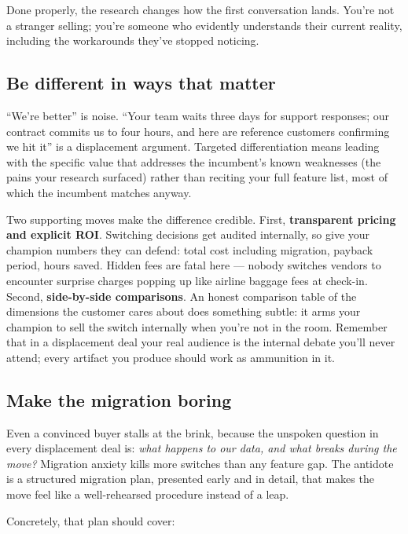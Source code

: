 Done properly, the research changes how the first conversation lands. You're not a stranger selling; you're someone who evidently understands their current reality, including the workarounds they've stopped noticing.



\subsection{Be different in ways that matter}


``We're better'' is noise. ``Your team waits three days for support responses; our contract commits us to four hours, and here are reference customers confirming we hit it'' is a displacement argument. Targeted differentiation means leading with the specific value that addresses the incumbent's known weaknesses (the pains your research surfaced) rather than reciting your full feature list, most of which the incumbent matches anyway.


Two supporting moves make the difference credible. First, \textbf{transparent pricing and explicit ROI}. Switching decisions get audited internally, so give your champion numbers they can defend: total cost including migration, payback period, hours saved. Hidden fees are fatal here — nobody switches vendors to encounter surprise charges popping up like airline baggage fees at check-in. Second, \textbf{side-by-side comparisons}. An honest comparison table of the dimensions the customer cares about does something subtle: it arms your champion to sell the switch internally when you're not in the room. Remember that in a displacement deal your real audience is the internal debate you'll never attend; every artifact you produce should work as ammunition in it.



\subsection{Make the migration boring}


Even a convinced buyer stalls at the brink, because the unspoken question in every displacement deal is: \emph{what happens to our data, and what breaks during the move?} Migration anxiety kills more switches than any feature gap. The antidote is a structured migration plan, presented early and in detail, that makes the move feel like a well-rehearsed procedure instead of a leap.


Concretely, that plan should cover:


